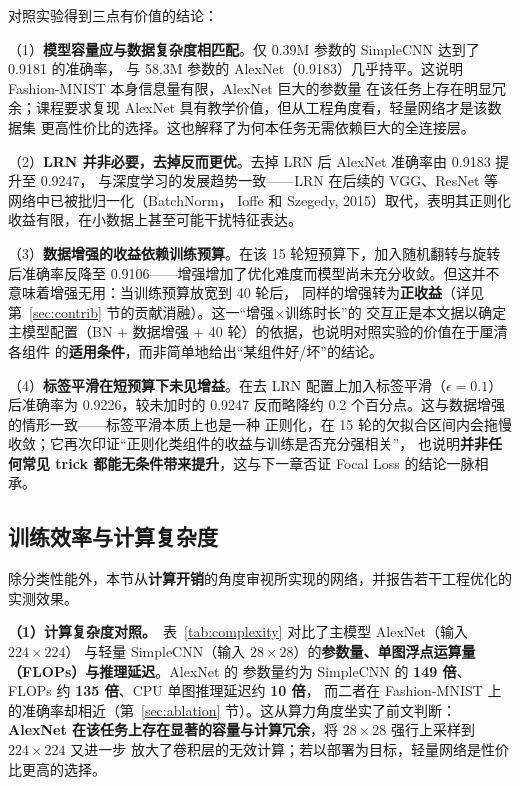 \documentclass[12pt,a4paper,fontset=fandol]{ctexart}   %
\numberwithin{figure}{section}
\numberwithin{table}{section}
\numberwithin{equation}{section}
\begin{document}
对照实验得到三点有价值的结论：

（1）\textbf{模型容量应与数据复杂度相匹配}。仅 0.39M 参数的 SimpleCNN 达到了 0.9181 的准确率，
与 58.3M 参数的 AlexNet（0.9183）几乎持平。这说明 Fashion-MNIST 本身信息量有限，AlexNet 巨大的参数量
在该任务上存在明显冗余；课程要求复现 AlexNet 具有教学价值，但从工程角度看，轻量网络才是该数据集
更高性价比的选择。这也解释了为何本任务无需依赖巨大的全连接层。

（2）\textbf{LRN 并非必要，去掉反而更优}。去掉 LRN 后 AlexNet 准确率由 0.9183 提升至 0.9247，
与深度学习的发展趋势一致——LRN 在后续的 VGG、ResNet 等网络中已被批归一化（BatchNorm，
Ioffe 和 Szegedy, 2015）取代，表明其正则化收益有限，在小数据上甚至可能干扰特征表达。

（3）\textbf{数据增强的收益依赖训练预算}。在该 15 轮短预算下，加入随机翻转与旋转后准确率反降至
0.9106——增强增加了优化难度而模型尚未充分收敛。但这并不意味着增强无用：当训练预算放宽到 40 轮后，
同样的增强转为\textbf{正收益}（详见第~\ref{sec:contrib} 节的贡献消融）。这一“增强$\times$训练时长”的
交互正是本文据以确定主模型配置（BN + 数据增强 + 40 轮）的依据，也说明对照实验的价值在于厘清各组件
的\textbf{适用条件}，而非简单地给出“某组件好/坏”的结论。

（4）\textbf{标签平滑在短预算下未见增益}。在去 LRN 配置上加入标签平滑（$\epsilon=0.1$）后准确率为
0.9226，较未加时的 0.9247 反而略降约 0.2 个百分点。这与数据增强的情形一致——标签平滑本质上也是一种
正则化，在 15 轮的欠拟合区间内会拖慢收敛；它再次印证“正则化类组件的收益与训练是否充分强相关”，
也说明\textbf{并非任何常见 trick 都能无条件带来提升}，这与下一章否证 Focal Loss 的结论一脉相承。

\subsection{训练效率与计算复杂度}\label{sec:efficiency}
除分类性能外，本节从\textbf{计算开销}的角度审视所实现的网络，并报告若干工程优化的实测效果。

\textbf{（1）计算复杂度对照。}\ 表~\ref{tab:complexity} 对比了主模型 AlexNet（输入 $224\times224$）
与轻量 SimpleCNN（输入 $28\times28$）的\textbf{参数量、单图浮点运算量（FLOPs）与推理延迟}。AlexNet 的
参数量约为 SimpleCNN 的 \textbf{149 倍}、FLOPs 约 \textbf{135 倍}、CPU 单图推理延迟约 \textbf{10 倍}，
而二者在 Fashion-MNIST 上的准确率却相近（第~\ref{sec:ablation} 节）。这从算力角度坐实了前文判断：
\textbf{AlexNet 在该任务上存在显著的容量与计算冗余}，将 $28\times28$ 强行上采样到 $224\times224$ 又进一步
放大了卷积层的无效计算；若以部署为目标，轻量网络是性价比更高的选择。
\end{document}
